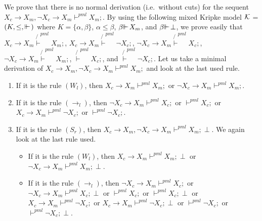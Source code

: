 \documentclass{jancl}
\begin{document}
\begin{proof*} We prove that there is no normal derivation (i.e.\  without
cuts) for the sequent $ X_c {\rightarrow} X_m , \neg X_c {\rightarrow} X_m {\vdash} ^{pml} X_m ;$.
By using the following mixed Kripke model $\cal K$ = $(K , {\leq} ,
{\ifmmode{ {\vdash}\mkern-7.6mu
{\vdash}\mkern2mu}\else{ {\vdash}\kern-.28em
{\vdash}\hskip1pt\ }\fi\relax})$ where $ K = \{ \alpha , \beta \}$, $\alpha {\leq} \beta$,
$\beta {\ifmmode{ {\vdash}\mkern-7.6mu
{\vdash}\mkern2mu}\else{ {\vdash}\kern-.28em
{\vdash}\hskip1pt\ }\fi\relax} X_m$, and $\beta {\ifmmode{ {\vdash}\mkern-7.6mu
{\vdash}\mkern2mu}\else{ {\vdash}\kern-.28em
{\vdash}\hskip1pt\ }\fi\relax} {\perp}$, we prove easily that
$X_c {\rightarrow} X_m \not {\vdash} ^{pml} X_m ;$, $X_c {\rightarrow} X_m \not {\vdash} ^{pml} \neg X_c
;$, $\neg X_c {\rightarrow} X_m \not {\vdash} ^{pml} X_c ;$, $\neg X_c {\rightarrow} X_m \not {\vdash}
^{pml} X_m ;$, $\not {\vdash} ^{pml} X_c ;$, and $\not {\vdash} ^{pml} \neg X_c
;$.  Let us take a minimal derivation of $ X_c {\rightarrow} X_m , \neg X_c {\rightarrow}
X_m {\vdash} ^{pml} X_m ;$ and look at the last used rule.
\begin{enumerate}
\item If it is the rule $(W_l)$, then $X_c {\rightarrow} X_m {\vdash} ^{pml} X_m ;$
or $\neg X_c {\rightarrow} X_m {\vdash} ^{pml} X_m ;$.

\item If it is the rule $({\rightarrow} _l)$, then $\neg X_c {\rightarrow} X_m {\vdash} ^{pml}
X_c ;$ or ${\vdash} ^{pml} X_c ;$ or $X_c {\rightarrow} X_m {\vdash} ^{pml} \neg X_c ;$
or $ {\vdash} ^{pml} \neg X_c ;$.

\item If it is the rule $(S_r)$, then $ X_c {\rightarrow} X_m , \neg X_c {\rightarrow}
X_m {\vdash} ^{pml} X_m ; {\perp} $. We again look at the last rule used.
\begin{itemize}
    \item If it is the rule $(W_l)$, then $X_c {\rightarrow} X_m {\vdash} ^{pml} X_m ; {\perp} $
or $\neg X_c {\rightarrow} X_m {\vdash} ^{pml} X_m ; {\perp} $.

    \item If it is the rule $({\rightarrow} _l)$, then $\neg X_c {\rightarrow} X_m {\vdash} ^{pml} X_c
;$ or $\neg X_c {\rightarrow} X_m {\vdash} ^{pml} X_c ; {\perp}$ or ${\vdash} ^{pml} X_c ;$
or ${\vdash} ^{pml} X_c ; {\perp} $ or $X_c {\rightarrow} X_m {\vdash} ^{pml} \neg X_c ;$
or $X_c {\rightarrow} X_m{\vdash} ^{pml} \neg X_c ; {\perp}$ or $ {\vdash} ^{pml} \neg X_c
;$ or $ {\vdash} ^{pml} \neg X_c ;{\perp}$.
\end{itemize}
\end{enumerate}
\end{proof*}
\end{document}
